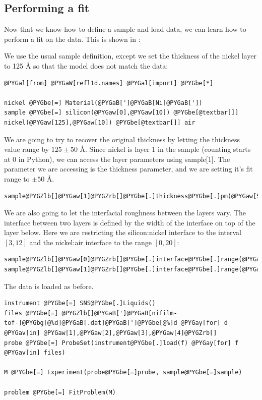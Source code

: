 \documentclass[letterpaper,10pt,english]{sphinxmanual}
\begin{document}
\subsection{Performing a fit}
\label{examples/ex1/nifilm-fit:performing-a-fit}\label{examples/ex1/nifilm-fit::doc}
Now that we know how to define a sample and load data, we can learn how
to perform a fit on the data.  This is shown in
:

We use the usual sample definition, except we set the thickness of the
nickel layer to 125 Å so that the model does not match the data:

\begin{Verbatim}[commandchars=@\[\]]
@PYGal[from] @PYGaW[refl1d.names] @PYGal[import] @PYGbe[*]

nickel @PYGbe[=] Material(@PYGaB[']@PYGaB[Ni]@PYGaB['])
sample @PYGbe[=] silicon(@PYGaw[0],@PYGaw[10]) @PYGbe[@textbar[]] nickel(@PYGaw[125],@PYGaw[10]) @PYGbe[@textbar[]] air
\end{Verbatim}

We are going to try to recover the original thickness by letting the
thickness value range by $125 \pm 50$ Å.  Since nickel is layer 1 in
the sample (counting starts at 0 in Python), we can access the layer
parameters using sample{[}1{]}.  The parameter we are accessing is the
thickness parameter, and we are setting it's fit range to $\pm 50$ Å.

\begin{Verbatim}[commandchars=@\[\]]
sample@PYGZlb[]@PYGaw[1]@PYGZrb[]@PYGbe[.]thickness@PYGbe[.]pm(@PYGaw[50])
\end{Verbatim}

We are also going to let the interfacial roughness between the layers vary.
The interface between two layers is defined by the width of the interface on
top of the layer below.  Here we are restricting the silicon:nickel interface
to the interval $[3,12]$ and the nickel:air interface to the range $[0,20]$:

\begin{Verbatim}[commandchars=@\[\]]
sample@PYGZlb[]@PYGaw[0]@PYGZrb[]@PYGbe[.]interface@PYGbe[.]range(@PYGaw[3],@PYGaw[12])
sample@PYGZlb[]@PYGaw[1]@PYGZrb[]@PYGbe[.]interface@PYGbe[.]range(@PYGaw[0],@PYGaw[20])
\end{Verbatim}

The data is loaded as before.

\begin{Verbatim}[commandchars=@\[\]]
instrument @PYGbe[=] SNS@PYGbe[.]Liquids()
files @PYGbe[=] @PYGZlb[]@PYGaB[']@PYGaB[nifilm-tof-]@PYGbg[@%d]@PYGaB[.dat]@PYGaB[']@PYGbe[@%]d @PYGay[for] d @PYGav[in] @PYGaw[1],@PYGaw[2],@PYGaw[3],@PYGaw[4]@PYGZrb[]
probe @PYGbe[=] ProbeSet(instrument@PYGbe[.]load(f) @PYGay[for] f @PYGav[in] files)

M @PYGbe[=] Experiment(probe@PYGbe[=]probe, sample@PYGbe[=]sample)

problem @PYGbe[=] FitProblem(M)
\end{Verbatim}
\end{document}
